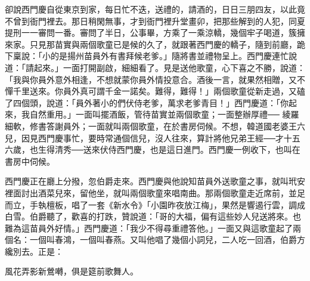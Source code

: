 卻說西門慶自從東京到家，每日忙不迭，送禮的，請酒的，日日三朋四友，以此竟不曾到衙門裡去。那日稍閑無事，才到衙門裡升堂畫卯，把那些解到的人犯，同夏提刑一一審問一番。審問了半日，公事畢，方乘了一乘涼轎，幾個牢子喝道，簇擁來家。只見那苗實與兩個歌童已是候的久了，就跟著西門慶的轎子，隨到前廳，跪下稟說：「小的是揚州苗員外有書拜候老爹。」隨將書並禮物呈上。西門慶連忙說道：「請起來。」一面打開副啟，細細看了。見是送他歌童，心下喜之不勝，說道：「我與你員外意外相逢，不想就蒙你員外情投意合。酒後一言，就果然相贈，又不憚千里送來。你員外真可謂千金一諾矣。難得，難得！」兩個歌童從新走過，又磕了四個頭，說道：「員外著小的們伏侍老爹，萬求老爹青目！」西門慶道：「你起來，我自然重用。」一面叫擺酒飯，管待苗實並兩個歌童；一面整辦厚禮── 綾羅細軟，修書答謝員外；一面就叫兩個歌童，在於書房伺候。不想，韓道國老婆王六兒，因見西門慶事忙，要時常通個信兒，沒人往來，算計將他兄弟王經──才十五六歲，也生得清秀──送來伏侍西門慶，也是這日進門。西門慶一例收下，也叫在書房中伺候。

西門慶正在廳上分撥，忽伯爵走來。西門慶與他說知苗員外送歌童之事，就叫玳安裡面討出酒菜兒來，留他坐，就叫兩個歌童來唱南曲。那兩個歌童走近席前，並足而立，手執檀板，唱了一套《新水令》「小園昨夜放江梅」，果然是響遏行雲，調成白雪。伯爵聽了，歡喜的打跌，贊說道：「哥的大福，偏有這些妙人兒送將來。也難為這苗員外好情。」西門慶道：「我少不得尋重禮答他。」一面又與這歌童起了兩個名：一個叫春鴻，一個叫春燕。又叫他唱了幾個小詞兒，二人吃一回酒，伯爵方纔別去。正是：

風花弄影新鶯囀，俱是筵前歌舞人。

